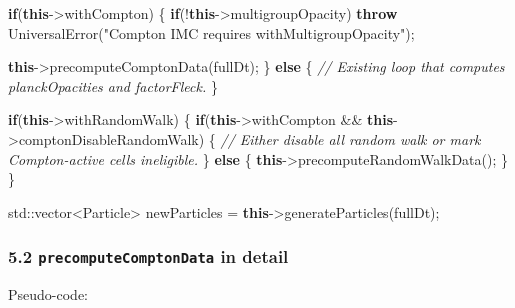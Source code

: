 \documentclass[
]{article}
\newenvironment{Shaded}{}{}
\newcommand{\BuiltInTok}[1]{\textcolor[rgb]{0.00,0.50,0.00}{#1}}
\newcommand{\CommentTok}[1]{\textcolor[rgb]{0.38,0.63,0.69}{\textit{#1}}}
\newcommand{\ControlFlowTok}[1]{\textcolor[rgb]{0.00,0.44,0.13}{\textbf{#1}}}
\newcommand{\KeywordTok}[1]{\textcolor[rgb]{0.00,0.44,0.13}{\textbf{#1}}}
\newcommand{\NormalTok}[1]{#1}
\newcommand{\OperatorTok}[1]{\textcolor[rgb]{0.40,0.40,0.40}{#1}}
\newcommand{\StringTok}[1]{\textcolor[rgb]{0.25,0.44,0.63}{#1}}
\begin{document}
\begin{Shaded}
\begin{Highlighting}[]
\ControlFlowTok{if}\OperatorTok{(}\KeywordTok{this}\OperatorTok{{-}\textgreater{}}\NormalTok{withCompton}\OperatorTok{)}
\OperatorTok{\{}
    \ControlFlowTok{if}\OperatorTok{(!}\KeywordTok{this}\OperatorTok{{-}\textgreater{}}\NormalTok{multigroupOpacity}\OperatorTok{)}
        \ControlFlowTok{throw}\NormalTok{ UniversalError}\OperatorTok{(}\StringTok{"Compton IMC requires withMultigroupOpacity"}\OperatorTok{);}

    \KeywordTok{this}\OperatorTok{{-}\textgreater{}}\NormalTok{precomputeComptonData}\OperatorTok{(}\NormalTok{fullDt}\OperatorTok{);}
\OperatorTok{\}}
\ControlFlowTok{else}
\OperatorTok{\{}
    \CommentTok{// Existing loop that computes planckOpacities and factorFleck.}
\OperatorTok{\}}

\ControlFlowTok{if}\OperatorTok{(}\KeywordTok{this}\OperatorTok{{-}\textgreater{}}\NormalTok{withRandomWalk}\OperatorTok{)}
\OperatorTok{\{}
    \ControlFlowTok{if}\OperatorTok{(}\KeywordTok{this}\OperatorTok{{-}\textgreater{}}\NormalTok{withCompton }\OperatorTok{\&\&} \KeywordTok{this}\OperatorTok{{-}\textgreater{}}\NormalTok{comptonDisableRandomWalk}\OperatorTok{)}
    \OperatorTok{\{}
        \CommentTok{// Either disable all random walk or mark Compton{-}active cells ineligible.}
    \OperatorTok{\}}
    \ControlFlowTok{else}
    \OperatorTok{\{}
        \KeywordTok{this}\OperatorTok{{-}\textgreater{}}\NormalTok{precomputeRandomWalkData}\OperatorTok{();}
    \OperatorTok{\}}
\OperatorTok{\}}

\BuiltInTok{std::}\NormalTok{vector}\OperatorTok{\textless{}}\NormalTok{Particle}\OperatorTok{\textgreater{}}\NormalTok{ newParticles }\OperatorTok{=} \KeywordTok{this}\OperatorTok{{-}\textgreater{}}\NormalTok{generateParticles}\OperatorTok{(}\NormalTok{fullDt}\OperatorTok{);}
\end{Highlighting}
\end{Shaded}

\subsubsection{\texorpdfstring{5.2 \texttt{precomputeComptonData} in
detail}{5.2 precomputeComptonData in detail}}\label{precomputecomptondata-in-detail}

Pseudo-code:
\end{document}

